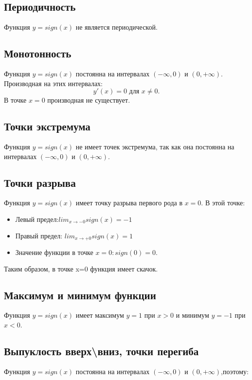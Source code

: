 \begin{flushleft}
		\subsection*{Периодичность}
		Функция $y=sign(x)$ не является периодической.
		 
		\subsection*{Монотонность}
		Функция $y=sign(x)$ постоянна на интервалах $(−\infty,0)$ и $(0,+\infty)$. Производная на этих интервалах:
		\[y′(x)=0\text{ для }x\neq0.\]
		В точке $x=0$ производная не существует.
		 
		\subsection*{Точки экстремума}
		Функция $y=sign(x)$ не имеет точек экстремума, так как она постоянна на интервалах $(−\infty,0)$ и $(0,+\infty)$.
		
		\subsection*{Точки разрыва}
		Функция $y=sign(x)$ имеет точку разрыва первого рода в $x=0$. В этой точке:
		
		\begin{itemize}
			\item Левый предел:$lim_{x\rightarrow-0}sign(x)=-1$
			\item Правый предел: $lim_{x\rightarrow+0}sign(x)=1$
			\item Значение функции в точке $x=0:sign(0)=0$.
		\end{itemize}
		
		Таким образом, в точке x=0 функция имеет скачок.
		 
		\subsection*{Максимум и минимум функции}
		 
		Функция $y=sign(x)$ имеет максимум $y=1$ при $x>0$ и минимум $y=−1$ при $x<0$.
		 
		\subsection*{Выпуклость вверх\textbackslash вниз, точки перегиба}
		Функция $y=sign(x)$ постоянна на интервалах $(−\infty,0)$ и $(0,+\infty)$,поэтому:
		 

\end{flushleft}
